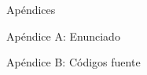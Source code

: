 \begin{section}{Apéndices}
	\begin{subsection}{Apéndice A: Enunciado}
		
	\end{subsection}
	\begin{subsection}{Apéndice B: Códigos fuente}
	\end{subsection}	
\end{section}
